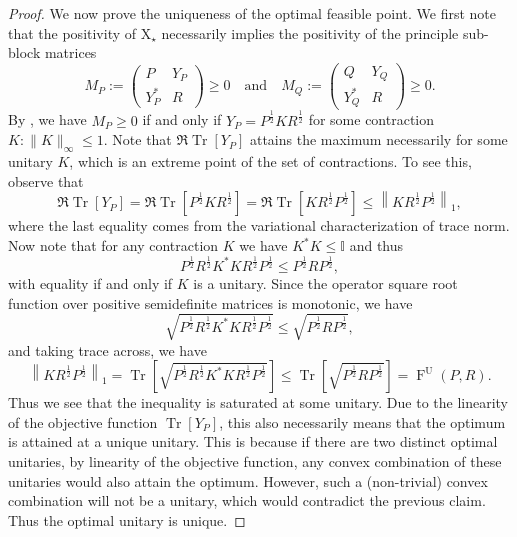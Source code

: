 \documentclass[12pt]{article}
\theoremstyle{definition}
\begin{document}
\begin{proof}
We now prove the uniqueness of the optimal feasible point. We first note that the positivity of $\mathrm{X}_\star$ necessarily implies the positivity of the principle sub-block matrices
\begin{equation}
    M_P := \begin{pmatrix}
        P & Y_P \\
        Y_P^* & R 
    \end{pmatrix} \geq 0
\quad \text{and} \quad 
    M_Q := \begin{pmatrix}
        Q & Y_Q \\
        Y_Q^* & R 
    \end{pmatrix} \geq 0.
\end{equation}
By \cite[Lemma 3.18]{watrous2018theory}, we have $M_P \geq 0$ if and only if $Y_P = P ^{\frac12} K R ^{\frac12}$ for some contraction $K : \|K\|_\infty \leq 1$. Note that $\Re \operatorname{Tr}[Y_P]$ attains the maximum necessarily for some unitary $K$, which is an extreme point of the set of contractions. To see this, observe that
\begin{equation}
    \Re \operatorname{Tr}[Y_P] = \Re \operatorname{Tr}\left[P ^{\frac12} K R ^{\frac12}\right] = \Re \operatorname{Tr}\left[ K R ^{\frac12}P ^{\frac12}\right] \leq \left\| K R ^{\frac12}P ^{\frac12} \right\|_1,
\end{equation}
where the last equality comes from the variational characterization of trace norm. Now note that for any contraction $K$ we have $K^* K \leq \mathbb I$ and thus
\begin{equation}
    P ^{\frac12} R ^{\frac12} K^* K R ^{\frac12} P ^{\frac12}  \leq P ^{\frac12} R P ^{\frac12}, 
\end{equation}
with equality if and only if $K$ is a unitary. Since the operator square root function over positive semidefinite matrices is monotonic, we have
\begin{equation}
   \sqrt{P ^{\frac12} R ^{\frac12} K^* K R ^{\frac12} P ^{\frac12}}  \leq \sqrt{P ^{\frac12} R P ^{\frac12}},
\end{equation}
and taking trace across, we have
 \begin{equation}
     \left\| K R ^{\frac12} P^{\frac12} \right\|_1=  \operatorname{Tr}\left[\sqrt{P ^{\frac12} R ^{\frac12} K^* K R ^{\frac12} P ^{\frac12}}\right] \leq \operatorname{Tr}\left[\sqrt{P ^{\frac12} R P ^{\frac12}} \right] = \operatorname{F}^\mathrm{U}(P,R). 
 \end{equation}
Thus we see that the inequality is saturated at some unitary. Due to the linearity of the objective function $\operatorname{Tr}[Y_P]$, this also necessarily means that the optimum is attained at a unique unitary. This is because if there are two distinct optimal unitaries, by linearity of the objective function, any convex combination of these unitaries would also attain the optimum. However, such a (non-trivial) convex combination will not be a unitary, which would contradict the previous claim. Thus the optimal unitary is unique. 


\end{proof}
\end{document}
